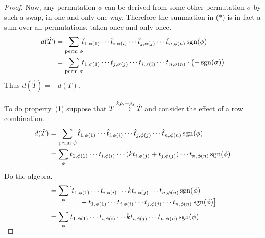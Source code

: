 \begin{proof}
Now, any permutation $\phi$ can be derived from some 
other permutation $\sigma$ by such a swap,
in one and only one way.
Therefore the summation in ($*$) is in fact a sum over all permutations,
taken once and only once.
\begin{align*}
  d(\hat{T})
  &=
  \sum_{\text{perm\ }\phi}\!\!
    \hat{t}_{1,\phi(1)}
    \cdots\hat{t}_{i,\phi(i)}
    \cdots\hat{t}_{j,\phi(j)}
    \cdots \hat{t}_{n,\phi(n)}
                                 \operatorname{sgn}(\phi)   \\
  &=\sum_{\text{perm\ }\sigma}\!\!
     t_{1,\sigma(1)}
    \cdots t_{j,\sigma(j)}
    \cdots t_{i,\sigma(i)}
    \cdots t_{n,\sigma(n)}
                                 \cdot\bigl(-\operatorname{sgn}(\sigma)\bigr)        
\end{align*}
Thus \( d(\hat{T})=-d(T) \).

To do property~(1) suppose that
\( T\;\smash[b]{\mathrel{ \mathop{\longrightarrow}\limits^{k\rho_i+\rho_j\mathstrut}_{ \begin{subarray}{l} \relax \end{subarray}}}}\;\hat{T} \)
and consider the effect of a row combination.
\begin{align*}
  d(\hat{T})
  &=\sum_{\text{perm\ }\phi}
    \hat{t}_{1,\phi(1)}\cdots\hat{t}_{i,\phi(i)}
    \cdots\hat{t}_{j,\phi(j)}\cdots\hat{t}_{n,\phi(n)}
                                 \operatorname{sgn}(\phi)                \\
  &=\sum_{\phi}
    t_{1,\phi(1)}\cdots t_{i,\phi(i)}
    \cdots (kt_{i,\phi(j)}+t_{j,\phi(j)})\cdots t_{n,\phi(n)}
                                 \operatorname{sgn}(\phi)
\end{align*}
Do the algebra.
\begin{align*}
  &= 
      \begin{aligned}[t]
        &\smash[b]{\sum_{\smash{\phi}}}\big[t_{1,\phi(1)}\cdots t_{i,\phi(i)}
          \cdots kt_{i,\phi(j)}\cdots t_{n,\phi(n)}
                                 \sgn(\phi)         \\ %
        &\hbox{}\qquad\quad\hbox{}
           +t_{1,\phi(1)}\cdots t_{i,\phi(i)}
           \cdots t_{j,\phi(j)}\cdots t_{n,\phi(n)}
                                 \sgn(\phi)\big]
      \end{aligned}                                               \\[.5ex]
  &=\begin{aligned}[t] 
         &\smash[b]{\sum_{\smash{\phi}}} \:t_{1,\phi(1)}\cdots t_{i,\phi(i)}
            \cdots kt_{i,\phi(j)}\cdots t_{n,\phi(n)}
                                 \sgn(\phi)           \\ %

\end{aligned}
\end{align*}
\end{proof}
